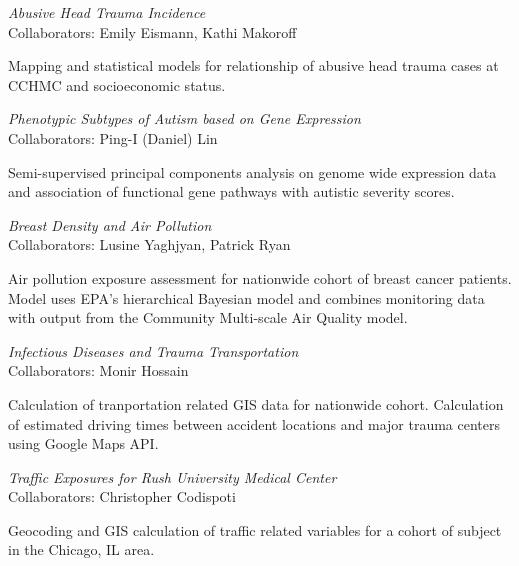 \documentclass[margin,line]{res}
\newenvironment{list1}{
  \begin{list}{\ding{113}}{%
      \setlength{\itemsep}{0in}
      \setlength{\parsep}{0in} \setlength{\parskip}{0in}
      \setlength{\topsep}{0in} \setlength{\partopsep}{0in} 
      \setlength{\leftmargin}{0.17in}}}{\end{list}}
\begin{document}
\begin{resume}
\textsl{Abusive Head Trauma Incidence} \\
Collaborators:  Emily Eismann, Kathi Makoroff\\
\vspace{-0.13in}
\begin{list1}
\item[] Mapping and statistical models for relationship of abusive head trauma cases at CCHMC and socioeconomic status.
\end{list1}

\textsl{Phenotypic Subtypes of Autism based on Gene Expression} \\
Collaborators:  Ping-I (Daniel) Lin\\
\vspace{-0.13in}
\begin{list1}
\item[] Semi-supervised principal components analysis on genome wide expression data and association of functional gene pathways with autistic severity scores.
\end{list1}


\textsl{Breast Density and Air Pollution} \\
Collaborators:  Lusine Yaghjyan, Patrick Ryan\\
\vspace{-0.13in}
\begin{list1}
\item[] Air pollution exposure assessment for nationwide cohort of breast cancer patients.  Model uses EPA's hierarchical Bayesian model and combines monitoring data with output from the Community Multi-scale Air Quality model.
\end{list1}

\textsl{Infectious Diseases and Trauma Transportation} \\
Collaborators:  Monir Hossain\\
\vspace{-0.13in}
\begin{list1}
\item[] Calculation of tranportation related GIS data for nationwide cohort.  Calculation of estimated driving times between accident locations and major trauma centers using Google Maps API.
\end{list1}

\textsl{Traffic Exposures for Rush University Medical Center} \\
Collaborators:  Christopher Codispoti\\
\vspace{-0.13in}
\begin{list1}
\item[] Geocoding and GIS calculation of traffic related variables for a cohort of subject in the Chicago, IL area.
\end{list1}


\end{resume}
\end{document}
